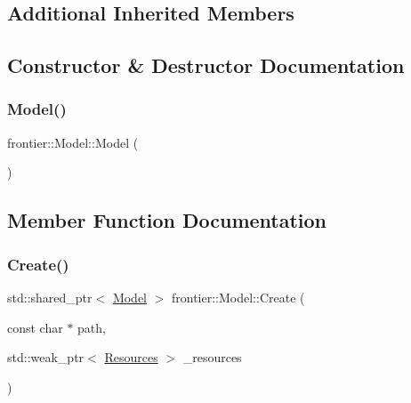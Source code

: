 \subsection*{Additional Inherited Members}


\subsection{Constructor \& Destructor Documentation}
\mbox{\label{classfrontier_1_1_model_a8285f56a5eff764d33adba7ba20b5a81}} 
\subsubsection{\texorpdfstring{Model()}{Model()}}
{\footnotesize\ttfamily frontier\+::\+Model\+::\+Model (\begin{DoxyParamCaption}{ }\end{DoxyParamCaption})}



\subsection{Member Function Documentation}
\mbox{\label{classfrontier_1_1_model_abd0a135e820403384354644e5a348e84}} 
\subsubsection{\texorpdfstring{Create()}{Create()}}
{\footnotesize\ttfamily std\+::shared\+\_\+ptr$<$ \hyperlink{classfrontier_1_1_model}{Model} $>$ frontier\+::\+Model\+::\+Create (\begin{DoxyParamCaption}\item[{const char $\ast$}]{path,  }\item[{std\+::weak\+\_\+ptr$<$ \hyperlink{classfrontier_1_1_resources}{Resources} $>$}]{\+\_\+resources }\end{DoxyParamCaption})\hspace{0.3cm}{\ttfamily [static]}}

\mbox{\label{classfrontier_1_1_model_ab969b8ae4c222ac60f347a5008b19bad}} 
